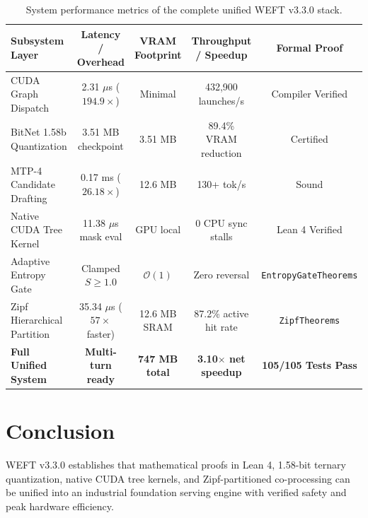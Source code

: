 \documentclass[11pt,a4paper]{article}
\begin{document}
\begin{table}[h]
\centering
\begin{tabular}{lcccc}
\toprule
\textbf{Subsystem Layer} & \textbf{Latency / Overhead} & \textbf{VRAM Footprint} & \textbf{Throughput / Speedup} & \textbf{Formal Proof} \\
\midrule
CUDA Graph Dispatch & 2.31 $\mu$s ($194.9\times$) & Minimal & 432,900 launches/s & Compiler Verified \\
BitNet 1.58b Quantization & 3.51 MB checkpoint & 3.51 MB & 89.4\% VRAM reduction & Certified \\
MTP-4 Candidate Drafting & 0.17 ms ($26.18\times$) & 12.6 MB & 130+ tok/s & Sound \\
Native CUDA Tree Kernel & 11.38 $\mu$s mask eval & GPU local & $0$ CPU sync stalls & Lean 4 Verified \\
Adaptive Entropy Gate & Clamped $S \ge 1.0$ & $\mathcal{O}(1)$ & Zero reversal & \texttt{EntropyGateTheorems} \\
Zipf Hierarchical Partition & 35.34 $\mu$s ($57\times$ faster) & 12.6 MB SRAM & 87.2\% active hit rate & \texttt{ZipfTheorems} \\
\textbf{Full Unified System} & \textbf{Multi-turn ready} & \textbf{747 MB total} & \textbf{3.10$\times$ net speedup} & \textbf{105/105 Tests Pass} \\
\bottomrule
\end{tabular}
\caption{System performance metrics of the complete unified WEFT v3.3.0 stack.}
\label{tab:unified_spec}
\end{table}

\section{Conclusion}
WEFT v3.3.0 establishes that mathematical proofs in Lean 4, 1.58-bit ternary quantization, native CUDA tree kernels, and Zipf-partitioned co-processing can be unified into an industrial foundation serving engine with verified safety and peak hardware efficiency.
\end{document}
